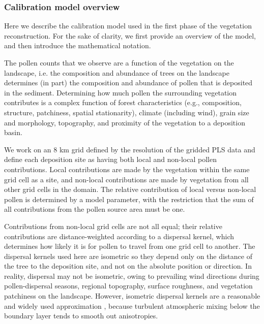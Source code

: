 \documentclass[12pt]{article}
\begin{document}

\subsubsection{Calibration model overview}
\label{sec:cal}

Here we describe the calibration model used in the first phase of the
vegetation reconstruction. For the sake of clarity, we first provide
an overview of the model, and then introduce the mathematical
notation.

The pollen counts that we observe are a function of the vegetation on
the landscape, i.e. the composition and abundance of trees on the
landscape determines (in part) the composition and abundance of pollen
that is deposited in the sediment. Determining how much pollen the
surrounding vegetation contributes is a complex function of forest
characteristics (e.g., composition, structure, patchiness, spatial
stationarity), climate (including wind), grain size and morphology,
topography, and proximity of the vegetation to a deposition basin.

We work on an 8 km grid defined by the resolution of the gridded PLS
data and define each deposition site as having both local and
non-local pollen contributions. Local contributions are made by the
vegetation within the same grid cell as a site, and non-local
contributions are made by vegetation from all other grid cells in the
domain. The relative contribution of local versus non-local pollen is
determined by a model parameter, with the restriction that the sum of
all contributions from the pollen source area must be one.

Contributions from non-local grid cells are not all equal; their
relative contributions are distance-weighted according to a dispersal
kernel, which determines how likely it is for pollen to travel from
one grid cell to another. The dispersal kernels used here are
isometric so they depend only on the distance of the tree to the
deposition site, and not on the absolute position or direction. In
reality, dispersal may not be isometric, owing to prevailing wind
directions during pollen-dispersal seasons, regional topography,
surface roughness, and vegetation patchiness on the
landscape. However, isometric dispersal kernels are a reasonable and
widely used approximation \citep{sugita2007theory1,
  sugita2007theory2}, because turbulent atmospheric mixing below the
boundary layer tends to smooth out anisotropies.
\end{document}
